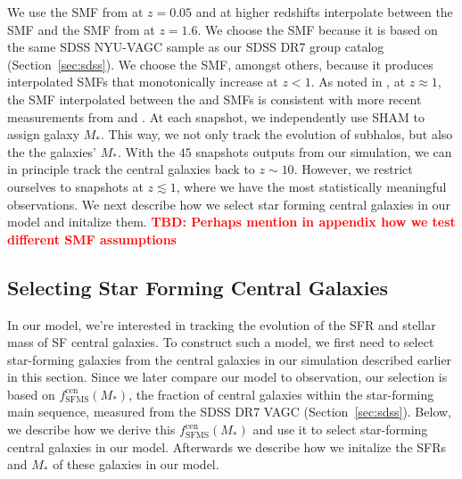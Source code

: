 \documentclass[12pt, letterpaper, preprint]{aastex}
\newcommand{\todo}[1]{{\bf \textcolor{red}{#1}}}
\begin{document}
We use the SMF from \cite{li2009} at $z = 0.05$ and at higher redshifts 
interpolate between the \cite{li2009} SMF and the SMF from \cite{marchesini2009} 
at $z = 1.6$. We choose the \cite{li2009} SMF because it is based on the 
same SDSS NYU-VAGC sample as our SDSS DR7 group catalog (Section~\ref{sec:sdss}). 
We choose the \cite{marchesini2009} SMF, amongst others, because it produces 
interpolated SMFs that monotonically increase at $z < 1$. As noted in 
\cite{hahn2017a}, at $z \approx 1$, the SMF interpolated between the 
\cite{li2009} and \cite{marchesini2009} SMFs is consistent with more 
recent measurements from \cite{muzzin2013} and \cite{ilbert2013}. 
At each snapshot, we independently use SHAM to assign galaxy $M_*$. 
This way, we not only track the evolution of subhalos, but also the 
the galaxies' $M_*$. With the $45$ snapshots outputs from our simulation, 
we can in principle track the central galaxies back to $z \sim 10$. 
However, we restrict ourselves to snapshots at $z \lesssim 1$, where we 
have the most statistically meaningful observations. We next describe
how we select star forming central galaxies in our model and initalize them. 
\todo{TBD: Perhaps mention in appendix how we test different SMF assumptions}%


\subsection{Selecting Star Forming Central Galaxies}  
In our model, we're interested in tracking the evolution of the
SFR and stellar mass of SF central galaxies. To construct such a model, 
we first need to select star-forming galaxies from the central galaxies 
in our simulation described earlier in this section. Since we later 
compare our model to observation, our selection is based on 
$f^\mathrm{cen}_\mathrm{SFMS}(M_*)$, the fraction of central galaxies 
within the star-forming main sequence, measured from the SDSS DR7 VAGC 
(Section~\ref{sec:sdss}). Below, we describe how we derive this 
$f^\mathrm{cen}_\mathrm{SFMS}(M_*)$ and use it to select star-forming 
central galaxies in our model. Afterwards we describe how we initalize 
the SFRs and $M_*$ of these galaxies in our model.
\end{document}
